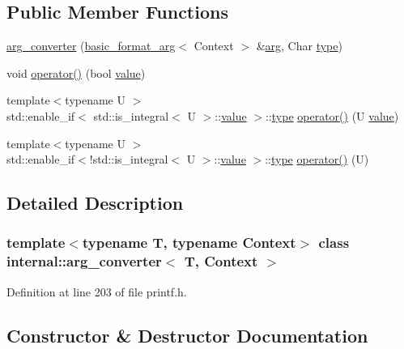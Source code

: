 \subsection*{Public Member Functions}
\begin{DoxyCompactItemize}
\item 
\hyperlink{classinternal_1_1arg__converter_a0fcaaa09e5ee1cf573b29170cc99e708}{arg\+\_\+converter} (\hyperlink{classbasic__format__arg}{basic\+\_\+format\+\_\+arg}$<$ Context $>$ \&\hyperlink{core_8h_ab87859023d64d26171b1e74a3d0c3b99}{arg}, Char \hyperlink{namespaceinternal_a8661864098ac0acff9a6dd7e66f59038}{type})
\item 
void \hyperlink{classinternal_1_1arg__converter_aa1775af02483433ce44a1bccc58b1eb7}{operator()} (bool \hyperlink{classinternal_1_1value}{value})
\item 
{\footnotesize template$<$typename U $>$ }\\std\+::enable\+\_\+if$<$ std\+::is\+\_\+integral$<$ U $>$\+::\hyperlink{classinternal_1_1value}{value} $>$\+::\hyperlink{namespaceinternal_a8661864098ac0acff9a6dd7e66f59038}{type} \hyperlink{classinternal_1_1arg__converter_a668fe71d2991260b6c7eac4a9e663a60}{operator()} (U \hyperlink{classinternal_1_1value}{value})
\item 
{\footnotesize template$<$typename U $>$ }\\std\+::enable\+\_\+if$<$!std\+::is\+\_\+integral$<$ U $>$\+::\hyperlink{classinternal_1_1value}{value} $>$\+::\hyperlink{namespaceinternal_a8661864098ac0acff9a6dd7e66f59038}{type} \hyperlink{classinternal_1_1arg__converter_a9b2f70002d7b681658622f8551126399}{operator()} (U)
\end{DoxyCompactItemize}


\subsection{Detailed Description}
\subsubsection*{template$<$typename T, typename Context$>$\newline
class internal\+::arg\+\_\+converter$<$ T, Context $>$}



Definition at line 203 of file printf.\+h.



\subsection{Constructor \& Destructor Documentation}
\mbox{\label{classinternal_1_1arg__converter_a0fcaaa09e5ee1cf573b29170cc99e708}} 
